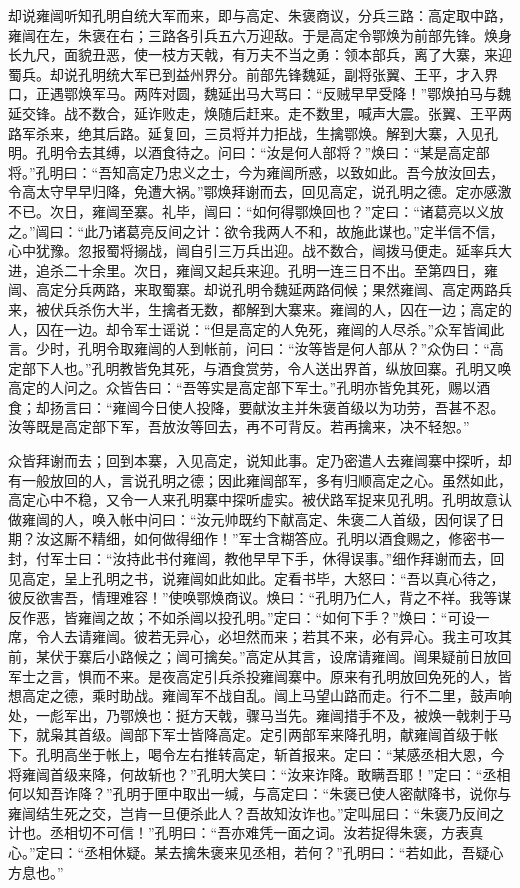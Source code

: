 却说雍闿听知孔明自统大军而来，即与高定、朱褒商议，分兵三路：高定取中路，雍闿在左，朱褒在右；三路各引兵五六万迎敌。于是高定令鄂焕为前部先锋。焕身长九尺，面貌丑恶，使一枝方天戟，有万夫不当之勇：领本部兵，离了大寨，来迎蜀兵。却说孔明统大军已到益州界分。前部先锋魏延，副将张翼、王平，才入界口，正遇鄂焕军马。两阵对圆，魏延出马大骂曰：“反贼早早受降！”鄂焕拍马与魏延交锋。战不数合，延诈败走，焕随后赶来。走不数里，喊声大震。张翼、王平两路军杀来，绝其后路。延复回，三员将并力拒战，生擒鄂焕。解到大寨，入见孔明。孔明令去其缚，以酒食待之。问曰：“汝是何人部将？”焕曰：“某是高定部将。”孔明曰：“吾知高定乃忠义之士，今为雍闿所惑，以致如此。吾今放汝回去，令高太守早早归降，免遭大祸。”鄂焕拜谢而去，回见高定，说孔明之德。定亦感激不已。次日，雍闿至寨。礼毕，闿曰：“如何得鄂焕回也？”定曰：“诸葛亮以义放之。”闿曰：“此乃诸葛亮反间之计：欲令我两人不和，故施此谋也。”定半信不信，心中犹豫。忽报蜀将搦战，闿自引三万兵出迎。战不数合，闿拨马便走。延率兵大进，追杀二十余里。次日，雍闿又起兵来迎。孔明一连三日不出。至第四日，雍闿、高定分兵两路，来取蜀寨。却说孔明令魏延两路伺候；果然雍闿、高定两路兵来，被伏兵杀伤大半，生擒者无数，都解到大寨来。雍闿的人，囚在一边；高定的人，囚在一边。却令军士谣说：“但是高定的人免死，雍闿的人尽杀。”众军皆闻此言。少时，孔明令取雍闿的人到帐前，问曰：“汝等皆是何人部从？”众伪曰：“高定部下人也。”孔明教皆免其死，与酒食赏劳，令人送出界首，纵放回寨。孔明又唤高定的人问之。众皆告曰：“吾等实是高定部下军士。”孔明亦皆免其死，赐以酒食；却扬言曰：“雍闿今日使人投降，要献汝主并朱褒首级以为功劳，吾甚不忍。汝等既是高定部下军，吾放汝等回去，再不可背反。若再擒来，决不轻恕。”

众皆拜谢而去；回到本寨，入见高定，说知此事。定乃密遣人去雍闿寨中探听，却有一般放回的人，言说孔明之德；因此雍闿部军，多有归顺高定之心。虽然如此，高定心中不稳，又令一人来孔明寨中探听虚实。被伏路军捉来见孔明。孔明故意认做雍闿的人，唤入帐中问曰：“汝元帅既约下献高定、朱褒二人首级，因何误了日期？汝这厮不精细，如何做得细作！”军士含糊答应。孔明以酒食赐之，修密书一封，付军士曰：“汝持此书付雍闿，教他早早下手，休得误事。”细作拜谢而去，回见高定，呈上孔明之书，说雍闿如此如此。定看书毕，大怒曰：“吾以真心待之，彼反欲害吾，情理难容！”使唤鄂焕商议。焕曰：“孔明乃仁人，背之不祥。我等谋反作恶，皆雍闿之故；不如杀闿以投孔明。”定曰：“如何下手？”焕曰：“可设一席，令人去请雍闿。彼若无异心，必坦然而来；若其不来，必有异心。我主可攻其前，某伏于寨后小路候之；闿可擒矣。”高定从其言，设席请雍闿。闿果疑前日放回军士之言，惧而不来。是夜高定引兵杀投雍闿寨中。原来有孔明放回免死的人，皆想高定之德，乘时助战。雍闿军不战自乱。闿上马望山路而走。行不二里，鼓声响处，一彪军出，乃鄂焕也：挺方天戟，骤马当先。雍闿措手不及，被焕一戟刺于马下，就枭其首级。闿部下军士皆降高定。定引两部军来降孔明，献雍闿首级于帐下。孔明高坐于帐上，喝令左右推转高定，斩首报来。定曰：“某感丞相大恩，今将雍闿首级来降，何故斩也？”孔明大笑曰：“汝来诈降。敢瞒吾耶！”定曰：“丞相何以知吾诈降？”孔明于匣中取出一缄，与高定曰：“朱褒已使人密献降书，说你与雍闿结生死之交，岂肯一旦便杀此人？吾故知汝诈也。”定叫屈曰：“朱褒乃反间之计也。丞相切不可信！”孔明曰：“吾亦难凭一面之词。汝若捉得朱褒，方表真心。”定曰：“丞相休疑。某去擒朱褒来见丞相，若何？”孔明曰：“若如此，吾疑心方息也。”

